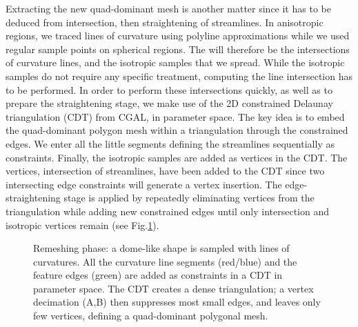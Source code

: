 Extracting the new quad-dominant mesh is another matter since it has
to be deduced from intersection, then straightening of streamlines.
In anisotropic regions, we traced lines of curvature using polyline
approximations while we used regular sample points on spherical
regions. The  will therefore be the intersections of
curvature lines, and the isotropic samples that we spread. While the
isotropic samples do not require any specific treatment, computing the
line intersection has to be performed.  In order to perform these
intersections quickly, as well as to prepare the straightening stage,
we make use of the 2D constrained Delaunay triangulation (CDT) from
CGAL, in parameter space. The key idea is to embed the quad-dominant
polygon mesh within a triangulation through the constrained edges. We
enter all the little segments defining the streamlines sequentially as
constraints.  Finally, the isotropic samples are added as vertices in
the CDT. The vertices, intersection of streamlines, have
 been added to the CDT since two intersecting
edge constraints will generate a vertex insertion. The
edge-straightening stage is applied by repeatedly eliminating vertices
from the triangulation while adding new constrained edges until only
intersection and isotropic vertices remain (see
Fig.\ref{fig:trimming}).

\begin{figure}
  \centering
  \caption{Remeshing phase: a dome-like shape is sampled with lines of
  curvatures. All the curvature line segments (red/blue) and the
  feature edges (green) are added as constraints in a CDT in parameter
  space. The CDT creates a dense triangulation; a vertex
  decimation (A,B) then suppresses most small edges, and leaves only
  few vertices, defining a quad-dominant polygonal mesh.}
  \label{fig:trimming}
\end{figure}


